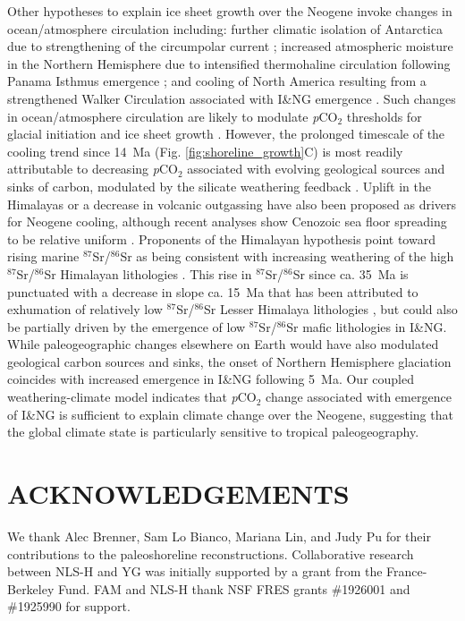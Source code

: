 \documentclass[11pt,letterpaper]{article}
\newcommand{\SrSr}{$^{87}$Sr/$^{86}$Sr\xspace}
\newcommand{\pCOtwo}{\textit{p}CO$_{2}$\xspace}
\begin{document}
Other hypotheses to explain ice sheet growth over the Neogene invoke changes in ocean/atmosphere circulation including: further climatic isolation of Antarctica due to strengthening of the circumpolar current \cite{Shevenell2004a}; increased atmospheric moisture in the Northern Hemisphere due to intensified thermohaline circulation following Panama Isthmus emergence \cite{Haug1998a}; and cooling of North America resulting from a strengthened Walker Circulation associated with I\&NG emergence \cite{Molnar2015a}. Such changes in ocean/atmosphere circulation are likely to modulate \pCOtwo thresholds for glacial initiation and ice sheet growth \cite{DeConto2008a}. However, the prolonged timescale of the cooling trend since 14~Ma (Fig. \ref{fig:shoreline_growth}C) is most readily attributable to decreasing \pCOtwo associated with evolving geological sources and sinks of carbon, modulated by the silicate weathering feedback \cite{Walker1981a, Raymo1991a, Berner1997a, Kump1997a, Berner2001a}. Uplift in the Himalayas \cite{Raymo1988a} or a decrease in volcanic outgassing \cite{Berner1983a} have also been proposed as drivers for Neogene cooling, although recent analyses show Cenozoic sea floor spreading to be relative uniform \cite{Rowan2016a}. Proponents of the Himalayan hypothesis point toward rising marine \SrSr as being consistent with increasing weathering of the high \SrSr Himalayan lithologies \cite{Raymo1992a}. This rise in \SrSr since ca. 35~Ma is punctuated with a decrease in slope ca. 15~Ma that has been attributed to exhumation of relatively low \SrSr Lesser Himalaya lithologies \cite{Myrow2015a, Colleps2018a}, but could also be partially driven by the emergence of low \SrSr mafic lithologies in I\&NG. While paleogeographic changes elsewhere on Earth would have also modulated geological carbon sources and sinks, the onset of Northern Hemisphere glaciation coincides with increased emergence in I\&NG following 5~Ma. Our coupled weathering-climate model indicates that \pCOtwo change associated with emergence of I\&NG is sufficient to explain climate change over the Neogene, suggesting that the global climate state is particularly sensitive to tropical paleogeography.

\section*{ACKNOWLEDGEMENTS \label{sec:ACKNOWLEDGEMENTS}}

We thank Alec Brenner, Sam Lo Bianco, Mariana Lin, and Judy Pu for their contributions to the paleoshoreline reconstructions. Collaborative research between NLS-H and YG was initially supported by a grant from the France-Berkeley Fund. FAM and NLS-H thank NSF FRES grants \#1926001 and \#1925990 for support. 
\end{document}

